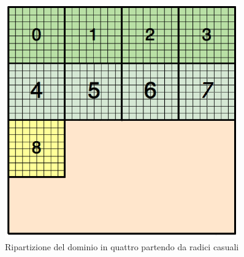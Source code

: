 \begin{figure}[H]
	\centering
	\includegraphics[width=0.9\textwidth]{immagini/block_on_grid.png}
	\caption{Ripartizione del dominio in quattro partendo da radici casuali}
		\label{fig:random_root}

\end{figure}
